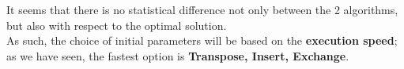 \documentclass[
12pt,
a4paper,
oneside,
headinclude,
footinclude]{article}
\theoremstyle{definition} %
\begin{document}
It seems that there is no statistical difference not only between the 2 algorithms, but also with respect to the optimal solution.\\
As such, the choice of initial parameters will be based on the \textbf{execution speed}; as we have seen, the fastest option is \textbf{Transpose, Insert, Exchange}.


\textbf{}
\end{document}
